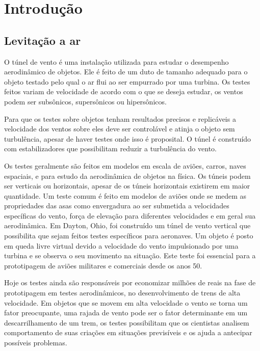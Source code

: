 
\chapter{Introdução} %

\section{Levitação a ar}

O túnel de vento é uma instalação utilizada para estudar o desempenho aerodinâmico de objetos. Ele é feito de um duto de tamanho adequado para o objeto testado pelo qual o ar flui ao ser empurrado por uma turbina. Os testes feitos variam de velocidade de acordo com o que se deseja estudar, os ventos podem ser subsônicos, supersônicos ou hipersônicos.


Para que os testes sobre objetos tenham resultados precisos e replicáveis a velocidade dos ventos sobre eles deve ser controlável e atinja o objeto sem turbulência, apesar de haver testes onde isso é proposital. O túnel é construído com estabilizadores que possibilitam reduzir a turbulência do vento.


Os testes geralmente são feitos em modelos em escala de aviões, carros, naves espaciais, e para  estudo da aerodinâmica de objetos na física. Os túneis podem ser verticais ou horizontais, apesar de os túneis horizontais existirem em maior quantidade. Um teste comum é feito em modelos de aviões onde se medem as propriedades das asas como envergadura ao ser submetida a velocidades específicas do vento, força de elevação para diferentes velocidades e em geral sua aerodinâmica. Em Dayton, Ohio\cite{vertical1946}, foi construído um túnel de vento vertical que possibilita que sejam feitos testes específicos para aeronaves. Um objeto é posto em queda livre virtual devido a velocidade do vento impulsionado por uma turbina e se observa o seu movimento na situação. Este teste foi essencial para a prototipagem de aviões militares e comerciais desde os anos 50.


Hoje os testes ainda são responsáveis por economizar milhões de reais na fase de prototipagem em testes aerodinâmicos, no desenvolvimento de trens de alta velocidade\cite{KWON2001}. Em objetos que se movem em alta velocidade o vento se torna um fator preocupante, uma rajada de vento pode ser o fator determinante em um descarrilhamento de um trem, os testes possibilitam que os cientistas analisem  comportamento de suas criações em situações previsíveis e os ajuda a antecipar possíveis problemas.

